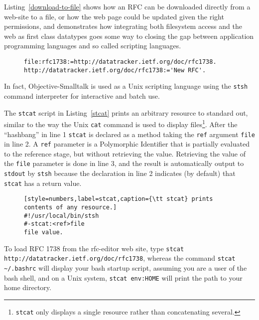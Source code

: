 \documentclass[preprint,authoryear]{llncs}
\begin{document}
Listing~\ref{download-to-file} shows how an RFC can be downloaded directly from a web-site
to a file, or how the web page could be updated given the right permissions, and demonstrates how integrating both filesystem access and the web as first class datatypes
goes some way to closing the gap between application programming languages and so called
scripting languages.

\begin{figure}[htbp]
\begin{lstlisting}[style=numbers,label=download-to-file,caption=Downloading an RFC to a file.]
file:rfc1738:=http://datatracker.ietf.org/doc/rfc1738.
http://datatracker.ietf.org/doc/rfc1738:='New RFC'.
\end{lstlisting}
\end{figure}

In fact,  Objective-Smalltalk is used as a Unix scripting language using the {\tt stsh} command
interpreter for interactive and batch use.  

The {\tt stcat} script in Listing~\ref{stcat} prints an arbitrary resource to standard out, 
similar to the way the Unix {\tt cat} command is used to display files\footnote{{\tt stcat} only 
displays a single resource rather than concatenating several.}.
After the ``hashbang'' in line 1 {\tt stcat} is declared as a method taking the {\tt ref} argument {\tt file} 
in line 2.
A {\tt ref} parameter is a Polymorphic Identifier that is partially evaluated to the reference stage,
but without retrieving the value.  Retrieving the value of the {\tt file} parameter is done in line 3,
and the result is automatically output to {\tt stdout} by {\tt stsh} because the declaration in line
2 indicates (by default) that {\tt stcat} has a return value.

\begin{figure}[htbp]
\begin{lstlisting}[style=numbers,label=stcat,caption={\tt stcat} prints contents of any resource.]
#!/usr/local/bin/stsh
#-stcat:<ref>file
file value.
\end{lstlisting}
\end{figure}

To load RFC 1738 from the rfc-editor web site, type  {\tt stcat http://datatracker.ietf.org/doc/rfc1738}, whereas 
the command {\tt stcat \~\//.bashrc} will display your bash startup script, assuming you are a user of the
bash shell, and on a Unix system, {\tt stcat env:HOME} will print the path to 
your home directory.
\end{document}
